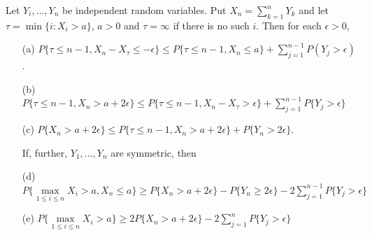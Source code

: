 \begin{lemma}\label{chap7-lem2}
Let $Y_{i},\ldots,Y_{n}$ be independent random variables. Put
$X_{n}=\sum\limits^{n}_{k=1}Y_{k}$ and let $\tau=\min\{i:X_{i}>a\}$,
$a>0$ and $\tau=\infty$ if there is no such $i$. Then for each
$\epsilon>0$,
\begin{itemize}
\item[\rm(a)] $P\{\tau\leq n-1,X_{n}-X_{\tau}\leq -\epsilon\}\leq
  P\{\tau\leq n-1,X_{n}\leq
  a\}+\sum\limits^{n-1}_{j=1}P(Y_{j}>\epsilon)$.

\item[\rm(b)] $P\{\tau\leq n-1,X_{n}>a+2\epsilon\}\leq P\{\tau\leq
  n-1,X_{n}-X_{\tau}>\epsilon\}+\sum\limits^{n-1}_{j=1}P\{Y_{j}>\epsilon\}$

\item[\rm(c)] $P\{X_{n}>a+2\epsilon\}\leq P\{\tau\leq n-1,X_{n}>a+2\epsilon\}+P\{Y_{n}>2\epsilon\}$.

If, further, $Y_{1},\ldots,Y_{n}$ are symmetric, then

\item[\rm(d)] $P\{\max\limits_{1\leq i\leq n}X_{i}>a,X_{n}\leq a\}\geq
  P\{X_{n}>a+2\epsilon\}-P\{Y_{n}\geq
  2\epsilon\}-2\sum\limits^{n-1}_{j=1}P\{Y_{j}>\epsilon\}$ 

\item[\rm(e)] $P\{\max\limits_{1\leq i\leq n}X_{i}>a\}\geq 2P\{X_{n}>a+2\epsilon\}-2\sum\limits^{n}_{j=1}P\{Y_{j}>\epsilon\}$
\end{itemize}
\end{lemma}

